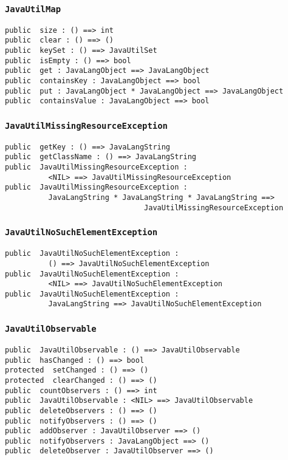 \documentclass[\pformat,12pt]{article}
\begin{document}
\subsubsection{\texttt{JavaUtilMap}}
\begin{small}
\begin{verbatim}
public  size : () ==> int
public  clear : () ==> ()
public  keySet : () ==> JavaUtilSet
public  isEmpty : () ==> bool
public  get : JavaLangObject ==> JavaLangObject
public  containsKey : JavaLangObject ==> bool
public  put : JavaLangObject * JavaLangObject ==> JavaLangObject
public  containsValue : JavaLangObject ==> bool
\end{verbatim}
\end{small}

\subsubsection{\texttt{JavaUtilMissingResourceException}}
\begin{small}
\begin{verbatim}
public  getKey : () ==> JavaLangString
public  getClassName : () ==> JavaLangString
public  JavaUtilMissingResourceException : 
          <NIL> ==> JavaUtilMissingResourceException
public  JavaUtilMissingResourceException : 
          JavaLangString * JavaLangString * JavaLangString ==> 
                                JavaUtilMissingResourceException
\end{verbatim}
\end{small}

\subsubsection{\texttt{JavaUtilNoSuchElementException}}
\begin{small}
\begin{verbatim}
public  JavaUtilNoSuchElementException : 
          () ==> JavaUtilNoSuchElementException
public  JavaUtilNoSuchElementException : 
          <NIL> ==> JavaUtilNoSuchElementException
public  JavaUtilNoSuchElementException : 
          JavaLangString ==> JavaUtilNoSuchElementException
\end{verbatim}
\end{small}

\subsubsection{\texttt{JavaUtilObservable}}
\begin{small}
\begin{verbatim}
public  JavaUtilObservable : () ==> JavaUtilObservable
public  hasChanged : () ==> bool
protected  setChanged : () ==> ()
protected  clearChanged : () ==> ()
public  countObservers : () ==> int
public  JavaUtilObservable : <NIL> ==> JavaUtilObservable
public  deleteObservers : () ==> ()
public  notifyObservers : () ==> ()
public  addObserver : JavaUtilObserver ==> ()
public  notifyObservers : JavaLangObject ==> ()
public  deleteObserver : JavaUtilObserver ==> ()
\end{verbatim}
\end{small}
\end{document}
